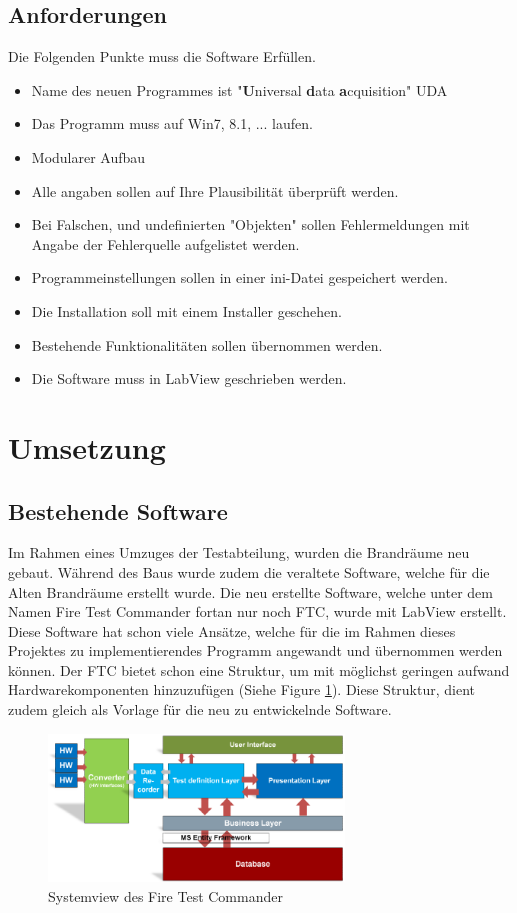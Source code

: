 \documentclass[10pt]{scrartcl}
\begin{document}
\subsection{Anforderungen}	
Die Folgenden Punkte muss die Software Erfüllen.
\begin{itemize}
	\item Name des neuen Programmes ist "\textbf{U}niversal \textbf{d}ata \textbf{a}cquisition" UDA
	\item Das Programm muss auf Win7, 8.1, ... laufen.
	\item Modularer Aufbau
	\item Alle angaben sollen auf Ihre Plausibilität überprüft werden.
	\item Bei Falschen, und undefinierten "Objekten" sollen Fehlermeldungen mit Angabe der Fehlerquelle aufgelistet werden.
	\item Programmeinstellungen sollen in einer ini-Datei gespeichert werden.
	\item Die Installation soll mit einem Installer geschehen.
	\item Bestehende Funktionalitäten sollen übernommen werden.
	\item Die Software muss in LabView geschrieben werden.
\end{itemize}
\section{Umsetzung}
\subsection{Bestehende Software}
Im Rahmen eines Umzuges der Testabteilung, wurden die Brandräume neu gebaut. Während des Baus wurde zudem die veraltete Software, welche für die Alten Brandräume erstellt wurde. Die neu erstellte Software, welche unter dem Namen Fire Test Commander fortan nur noch FTC, wurde mit LabView erstellt. Diese Software hat schon viele Ansätze, welche für die im Rahmen dieses Projektes zu implementierendes Programm angewandt und übernommen werden können.
Der FTC bietet schon eine Struktur, um mit möglichst geringen aufwand Hardwarekomponenten hinzuzufügen (Siehe Figure \ref{fig:SystemViewFTC}). Diese Struktur, dient zudem gleich als Vorlage für die neu zu entwickelnde Software.
\begin{figure}[htbp] 
	\centering
	\includegraphics[width=0.7\textwidth]{SystemviewFTC}
	\caption{Systemview des Fire Test Commander}
	\label{fig:SystemViewFTC}
\end{figure}
\end{document}
